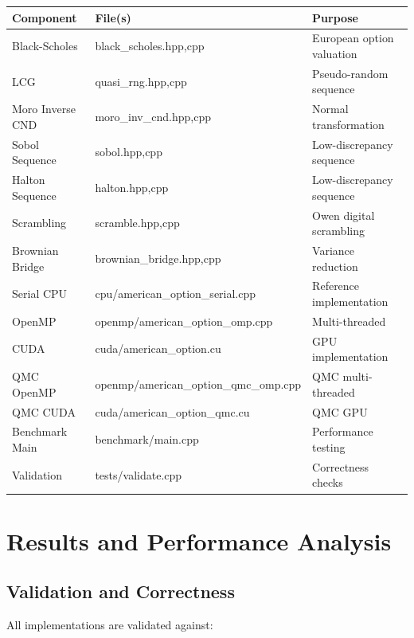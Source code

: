 \documentclass[11pt,a4paper]{article}
\begin{document}
\begin{table}[H]
\centering
\begin{tabular}{lll}
\toprule
\textbf{Component} & \textbf{File(s)} & \textbf{Purpose} \\
\midrule
Black-Scholes & black\_scholes.{hpp,cpp} & European option valuation \\
LCG & quasi\_rng.{hpp,cpp} & Pseudo-random sequence \\
Moro Inverse CND & moro\_inv\_cnd.{hpp,cpp} & Normal transformation \\
Sobol Sequence & sobol.{hpp,cpp} & Low-discrepancy sequence \\
Halton Sequence & halton.{hpp,cpp} & Low-discrepancy sequence \\
Scrambling & scramble.{hpp,cpp} & Owen digital scrambling \\
Brownian Bridge & brownian\_bridge.{hpp,cpp} & Variance reduction \\
Serial CPU & cpu/american\_option\_serial.cpp & Reference implementation \\
OpenMP & openmp/american\_option\_omp.cpp & Multi-threaded \\
CUDA & cuda/american\_option.cu & GPU implementation \\
QMC OpenMP & openmp/american\_option\_qmc\_omp.cpp & QMC multi-threaded \\
QMC CUDA & cuda/american\_option\_qmc.cu & QMC GPU \\
Benchmark Main & benchmark/main.cpp & Performance testing \\
Validation & tests/validate.cpp & Correctness checks \\
\bottomrule
\end{tabular}
\end{table}

\section{Results and Performance Analysis}\label{sec:results}

\subsection{Validation and Correctness}

All implementations are validated against:
\end{document}
